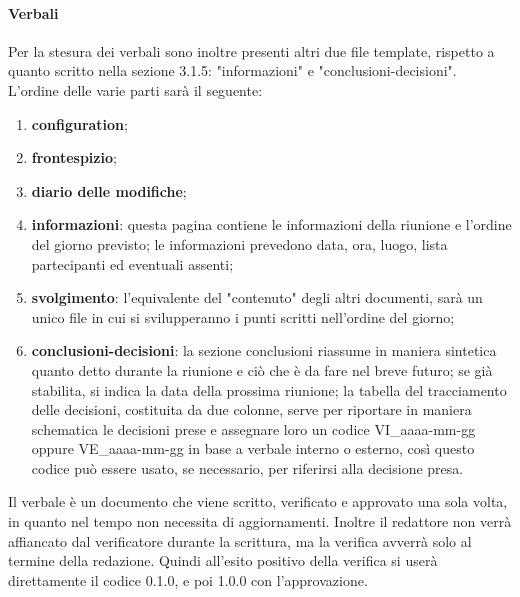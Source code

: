 \paragraph{Verbali} \hfill \linebreak
Per la stesura dei verbali sono inoltre presenti altri due file template, rispetto a quanto scritto nella 
sezione 3.1.5: "informazioni" e "conclusioni-decisioni". \\
L'ordine delle varie parti sarà il seguente:
\begin{enumerate}
        \item \textbf{configuration};
        \item \textbf{frontespizio};
        \item \textbf{diario delle modifiche};
        \item \textbf{informazioni}: 
                questa pagina contiene le informazioni della riunione e l'ordine del giorno previsto;
                le informazioni prevedono data, ora, luogo, lista partecipanti ed eventuali assenti;
        \item \textbf{svolgimento}:
                l'equivalente del "contenuto" degli altri documenti, sarà un unico file in cui si 
                svilupperanno i punti scritti nell'ordine del giorno;
        \item \textbf{conclusioni-decisioni}:
                la sezione conclusioni riassume in maniera sintetica quanto detto durante la riunione e  
                ciò che è da fare nel breve futuro; se già stabilita, si indica la data della prossima 
                riunione; \newline
                la tabella del tracciamento delle decisioni, costituita da due colonne, serve per 
                riportare in maniera schematica le decisioni prese e assegnare loro un codice 
                VI\_aaaa-mm-gg oppure VE\_aaaa-mm-gg in base a verbale interno o esterno, così 
                questo codice può essere usato, se necessario, per riferirsi alla decisione presa.
\end{enumerate}
Il verbale è un documento che viene scritto, verificato e approvato una sola volta, 
in quanto nel tempo non necessita di aggiornamenti.
Inoltre il redattore non verrà affiancato dal verificatore durante la scrittura, ma la verifica avverrà solo 
al termine della redazione. Quindi all'esito positivo della verifica si userà direttamente il codice 0.1.0, 
e poi 1.0.0 con l'approvazione.

